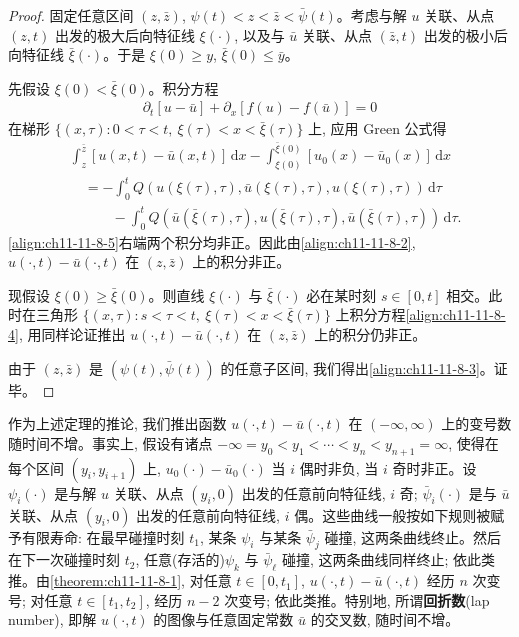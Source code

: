 \documentclass[../../main.tex]{subfiles}
\begin{document}
\begin{proof}
固定任意区间 $(z,\bar z)$, $\psi(t)<z<\bar z<\bar\psi(t)$。考虑与解 $u$ 关联、从点 $(z,t)$ 出发的极大后向特征线 $\xi(\cdot)$, 以及与 $\bar u$ 关联、从点 $(\bar z,t)$ 出发的极小后向特征线 $\bar\xi(\cdot)$。于是 $\xi(0)\geqslant y$, $\bar\xi(0)\leqslant\bar y$。

先假设 $\xi(0)<\bar\xi(0)$。积分方程
\begin{align}
\partial_t[u-\bar u]+\partial_x[f(u)-f(\bar u)]=0\label{align:ch11-11-8-4}
\end{align}
在梯形 $\{(x,\tau):0<\tau<t,\ \xi(\tau)<x<\bar\xi(\tau)\}$ 上, 应用 Green 公式得
\begin{align}
&\int_z^{\bar z}[u(x,t)-\bar u(x,t)]\,\mathrm{d}x-\int_{\xi(0)}^{\bar\xi(0)}[u_0(x)-\bar u_0(x)]\,\mathrm{d}x\nonumber\\
&\quad=-\int_0^t Q(u(\xi(\tau),\tau),\bar u(\xi(\tau),\tau),u(\xi(\tau),\tau))\,\mathrm{d}\tau\nonumber\\
&\qquad\quad-\int_0^t Q(\bar u(\bar\xi(\tau),\tau),u(\bar\xi(\tau),\tau),\bar u(\bar\xi(\tau),\tau))\,\mathrm{d}\tau.\label{align:ch11-11-8-5}
\end{align}
\eqref{align:ch11-11-8-5}右端两个积分均非正。因此由\eqref{align:ch11-11-8-2}, $u(\cdot,t)-\bar u(\cdot,t)$ 在 $(z,\bar z)$ 上的积分非正。

现假设 $\xi(0)\geqslant\bar\xi(0)$。则直线 $\xi(\cdot)$ 与 $\bar\xi(\cdot)$ 必在某时刻 $s\in[0,t]$ 相交。此时在三角形 $\{(x,\tau):s<\tau<t,\ \xi(\tau)<x<\bar\xi(\tau)\}$ 上积分方程\eqref{align:ch11-11-8-4}, 用同样论证推出 $u(\cdot,t)-\bar u(\cdot,t)$ 在 $(z,\bar z)$ 上的积分仍非正。

由于 $(z,\bar z)$ 是 $(\psi(t),\bar\psi(t))$ 的任意子区间, 我们得出\eqref{align:ch11-11-8-3}。证毕。
\end{proof}

作为上述定理的推论, 我们推出函数 $u(\cdot,t)-\bar u(\cdot,t)$ 在 $(-\infty,\infty)$ 上的变号数随时间不增。事实上, 假设有诸点 $-\infty=y_0<y_1<\cdots<y_n<y_{n+1}=\infty$, 使得在每个区间 $(y_i,y_{i+1})$ 上, $u_0(\cdot)-\bar u_0(\cdot)$ 当 $i$ 偶时非负, 当 $i$ 奇时非正。设 $\psi_i(\cdot)$ 是与解 $u$ 关联、从点 $(y_i,0)$ 出发的任意前向特征线, $i$ 奇; $\bar\psi_i(\cdot)$ 是与 $\bar u$ 关联、从点 $(y_i,0)$ 出发的任意前向特征线, $i$ 偶。这些曲线一般按如下规则被赋予有限寿命: 在最早碰撞时刻 $t_1$, 某条 $\psi_i$ 与某条 $\bar\psi_j$ 碰撞, 这两条曲线终止。然后在下一次碰撞时刻 $t_2$, 任意(存活的)$\psi_k$ 与 $\bar\psi_\ell$ 碰撞, 这两条曲线同样终止; 依此类推。由\cref{theorem:ch11-11-8-1}, 对任意 $t\in[0,t_1]$, $u(\cdot,t)-\bar u(\cdot,t)$ 经历 $n$ 次变号; 对任意 $t\in[t_1,t_2]$, 经历 $n-2$ 次变号; 依此类推。特别地, 所谓\textbf{回折数}(lap number), 即解 $u(\cdot,t)$ 的图像与任意固定常数 $\bar u$ 的交叉数, 随时间不增。
\end{document}
